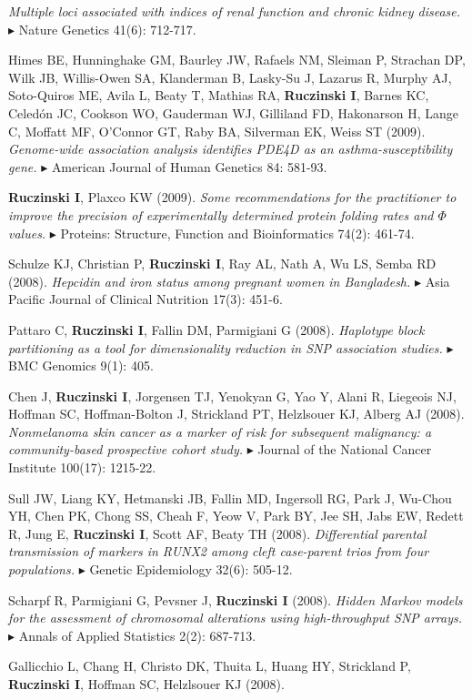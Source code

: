 \documentclass[10pt]{article}
\newcommand{\mine}{
  \addtocounter{enumi}{1}
\item[\fcolorbox{white}{grey}{\color{white} \tiny \arabic{enumi}}]
}
\newcommand{\dg}[1]{{\color{black} $\blacktriangleright$ {#1}}}
\begin{document}
{\it Multiple loci associated with indices of renal function and chronic kidney disease.}
\dg{Nature Genetics} 41(6): 712-717.
\item
Himes BE, Hunninghake GM, Baurley JW, Rafaels NM, Sleiman P, Strachan DP, Wilk JB, Willis-Owen SA, Klanderman B, Lasky-Su J, Lazarus R, Murphy AJ, Soto-Quiros ME, Avila L, Beaty T, Mathias RA, {\bf Ruczinski I}, Barnes KC, Celedón JC, Cookson WO, Gauderman WJ, Gilliland FD, Hakonarson H, Lange C, Moffatt MF, O'Connor GT, Raby BA, Silverman EK, Weiss ST (2009).
{\it Genome-wide association analysis identifies PDE4D as an asthma-susceptibility gene.}
\dg{American Journal of Human Genetics} 84: 581-93.
\mine
{\bf Ruczinski I}, Plaxco KW (2009). 
{\it Some recommendations for the practitioner to improve the precision of experimentally determined protein folding rates and $\Phi$ values.}
\dg{Proteins: Structure, Function and Bioinformatics} 74(2): 461-74. 
\item
Schulze KJ, Christian P, {\bf Ruczinski I}, Ray AL, Nath A, Wu LS, Semba RD (2008).
{\it Hepcidin and iron status among pregnant women in Bangladesh.} 
\dg{Asia Pacific Journal of Clinical Nutrition} 17(3): 451-6.
\item
Pattaro C, {\bf Ruczinski I}, Fallin DM, Parmigiani G (2008). 
{\it Haplotype block partitioning as a tool for dimensionality reduction in SNP association studies.}  
\dg{BMC Genomics} 9(1): 405.
\item
Chen J, {\bf Ruczinski I}, Jorgensen TJ, Yenokyan G, Yao Y, Alani R, Liegeois NJ, Hoffman SC, Hoffman-Bolton J, Strickland PT, Helzlsouer KJ, Alberg AJ (2008).
{\it Nonmelanoma skin cancer as a marker of risk for subsequent malignancy: a community-based prospective cohort study.}
\dg{Journal of the National Cancer Institute} 100(17): 1215-22. 
\item
Sull JW, Liang KY, Hetmanski JB, Fallin MD, Ingersoll RG, Park J, Wu-Chou YH, Chen PK, Chong SS, Cheah F, Yeow V, Park BY, Jee SH, Jabs EW, Redett R, Jung E, {\bf Ruczinski I}, Scott AF, Beaty TH (2008).
{\it Differential parental transmission of markers in RUNX2 among cleft case-parent trios from four populations.}
\dg{Genetic Epidemiology} 32(6): 505-12.
\mine
Scharpf R, Parmigiani G, Pevsner J, {\bf Ruczinski I} (2008). 
{\it Hidden Markov models for the assessment of chromosomal alterations using high-throughput SNP arrays.} 
\dg{Annals of Applied Statistics} 2(2): 687-713. 
\item
Gallicchio L, Chang H, Christo DK, Thuita L, Huang HY, Strickland P, {\bf Ruczinski I}, Hoffman SC, Helzlsouer KJ (2008). 
\end{document}

